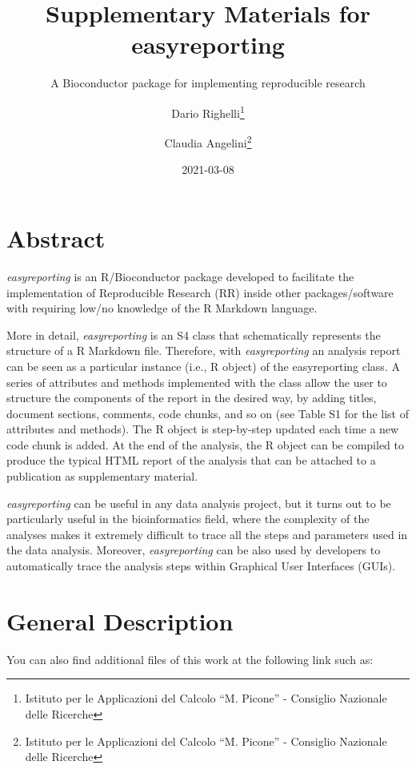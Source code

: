 \documentclass[
]{article}
\title{Supplementary Materials for easyreporting}
\subtitle{A Bioconductor package for implementing reproducible research}
\author{Dario Righelli\footnote{Istituto per le Applicazioni del Calcolo
  ``M. Picone'' - Consiglio Nazionale delle Ricerche} \and Claudia
Angelini\footnote{Istituto per le Applicazioni del Calcolo ``M. Picone''
  - Consiglio Nazionale delle Ricerche}}
\date{2021-03-08}
\begin{document}
\maketitle

\newcommand{\beginsupplement}{%
        \setcounter{table}{0}
        \renewcommand{\thetable}{S\arabic{table}}%
        \setcounter{figure}{0}
        \renewcommand{\thefigure}{S\arabic{figure}}%
     }

\hypertarget{abstract}{%
\section{Abstract}\label{abstract}}

\emph{easyreporting} is an R/Bioconductor package developed to
facilitate the implementation of Reproducible Research (RR) inside other
packages/software with requiring low/no knowledge of the R Markdown
language.

More in detail, \emph{easyreporting} is an S4 class that schematically
represents the structure of a R Markdown file. Therefore, with
\emph{easyreporting} an analysis report can be seen as a particular
instance (i.e., R object) of the easyreporting class. A series of
attributes and methods implemented with the class allow the user to
structure the components of the report in the desired way, by adding
titles, document sections, comments, code chunks, and so on (see Table
S1 for the list of attributes and methods). The R object is step-by-step
updated each time a new code chunk is added. At the end of the analysis,
the R object can be compiled to produce the typical HTML report of the
analysis that can be attached to a publication as supplementary
material.

\emph{easyreporting} can be useful in any data analysis project, but it
turns out to be particularly useful in the bioinformatics field, where
the complexity of the analyses makes it extremely difficult to trace all
the steps and parameters used in the data analysis. Moreover,
\emph{easyreporting} can be also used by developers to automatically
trace the analysis steps within Graphical User Interfaces (GUIs).

\hypertarget{general-description}{%
\section{General Description}\label{general-description}}

You can also find additional files of this work at the following link
such as:
\end{document}
